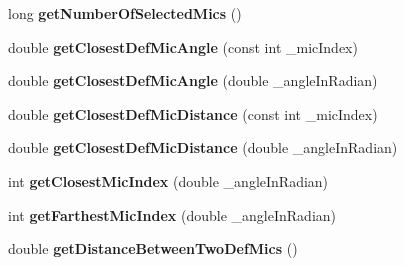 \begin{DoxyCompactItemize}
\item 
\hypertarget{class_ambisonic_virtual_mic_u_i_manager_a64e85160831ca523b83556e468a50649}{long {\bfseries get\-Number\-Of\-Selected\-Mics} ()}\label{class_ambisonic_virtual_mic_u_i_manager_a64e85160831ca523b83556e468a50649}

\item 
\hypertarget{class_ambisonic_virtual_mic_u_i_manager_a40e3c8170fb672b43ae71be0e838440a}{double {\bfseries get\-Closest\-Def\-Mic\-Angle} (const int \-\_\-mic\-Index)}\label{class_ambisonic_virtual_mic_u_i_manager_a40e3c8170fb672b43ae71be0e838440a}

\item 
\hypertarget{class_ambisonic_virtual_mic_u_i_manager_a909202e803917251c31af6ad083e0a7b}{double {\bfseries get\-Closest\-Def\-Mic\-Angle} (double \-\_\-angle\-In\-Radian)}\label{class_ambisonic_virtual_mic_u_i_manager_a909202e803917251c31af6ad083e0a7b}

\item 
\hypertarget{class_ambisonic_virtual_mic_u_i_manager_ab220b50f20b50dd94c37484933d1561f}{double {\bfseries get\-Closest\-Def\-Mic\-Distance} (const int \-\_\-mic\-Index)}\label{class_ambisonic_virtual_mic_u_i_manager_ab220b50f20b50dd94c37484933d1561f}

\item 
\hypertarget{class_ambisonic_virtual_mic_u_i_manager_a5e8380871bac9996c458106a05e11400}{double {\bfseries get\-Closest\-Def\-Mic\-Distance} (double \-\_\-angle\-In\-Radian)}\label{class_ambisonic_virtual_mic_u_i_manager_a5e8380871bac9996c458106a05e11400}

\item 
\hypertarget{class_ambisonic_virtual_mic_u_i_manager_a64da3a3aa8741ea53e350a35dcb3b613}{int {\bfseries get\-Closest\-Mic\-Index} (double \-\_\-angle\-In\-Radian)}\label{class_ambisonic_virtual_mic_u_i_manager_a64da3a3aa8741ea53e350a35dcb3b613}

\item 
\hypertarget{class_ambisonic_virtual_mic_u_i_manager_a3c9e1e018c48ee1b594c4f33661270ad}{int {\bfseries get\-Farthest\-Mic\-Index} (double \-\_\-angle\-In\-Radian)}\label{class_ambisonic_virtual_mic_u_i_manager_a3c9e1e018c48ee1b594c4f33661270ad}

\item 
\hypertarget{class_ambisonic_virtual_mic_u_i_manager_a8842ca0ebc70396a34992f840f7d315c}{double {\bfseries get\-Distance\-Between\-Two\-Def\-Mics} ()}\label{class_ambisonic_virtual_mic_u_i_manager_a8842ca0ebc70396a34992f840f7d315c}


\end{DoxyCompactItemize}
